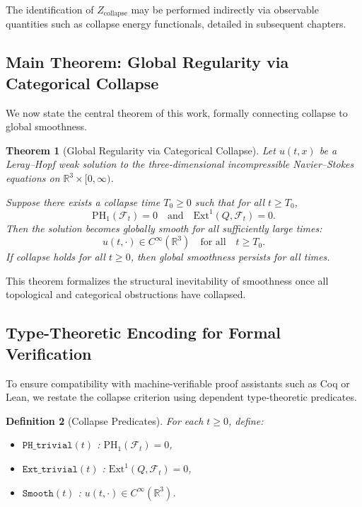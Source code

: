 \documentclass[11pt]{article}
\newtheorem{theorem}{Theorem}[section]
\newtheorem{definition}[theorem]{Definition}
\begin{document}
The identification of \( Z_{\mathrm{collapse}} \) may be performed indirectly via observable quantities such as collapse energy functionals, detailed in subsequent chapters.

\subsection{Main Theorem: Global Regularity via Categorical Collapse}

We now state the central theorem of this work, formally connecting collapse to global smoothness.

\begin{theorem}[Global Regularity via Categorical Collapse]
Let \( u(t,x) \) be a Leray–Hopf weak solution to the three-dimensional incompressible Navier–Stokes equations on \( \mathbb{R}^3 \times [0,\infty) \).

Suppose there exists a collapse time \( T_0 \geq 0 \) such that for all \( t \geq T_0 \),
\[
\mathrm{PH}_1(\mathcal{F}_t) = 0 \quad \text{and} \quad \mathrm{Ext}^1(Q, \mathcal{F}_t) = 0.
\]
Then the solution becomes globally smooth for all sufficiently large times:
\[
u(t, \cdot) \in C^\infty(\mathbb{R}^3) \quad \text{for all} \quad t \geq T_0.
\]
If collapse holds for all \( t \geq 0 \), then global smoothness persists for all times.
\end{theorem}

This theorem formalizes the structural inevitability of smoothness once all topological and categorical obstructions have collapsed.

\subsection{Type-Theoretic Encoding for Formal Verification}

To ensure compatibility with machine-verifiable proof assistants such as Coq or Lean, we restate the collapse criterion using dependent type-theoretic predicates.

\begin{definition}[Collapse Predicates]
For each \( t \geq 0 \), define:
\begin{itemize}
  \item \( \texttt{PH\_trivial}(t) \) : \quad \( \mathrm{PH}_1(\mathcal{F}_t) = 0 \),
  \item \( \texttt{Ext\_trivial}(t) \) : \quad \( \mathrm{Ext}^1(Q, \mathcal{F}_t) = 0 \),
  \item \( \texttt{Smooth}(t) \) : \quad \( u(t, \cdot) \in C^\infty(\mathbb{R}^3) \).
\end{itemize}
\end{definition}
\end{document}
